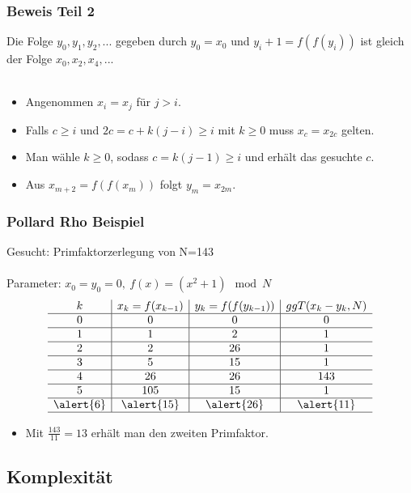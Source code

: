 \documentclass[mathserif, compress]{beamer}
\begin{document}
\begin{frame}
  \frametitle{Beweis Teil 2}
Die Folge $y_0, y_1, y_2, ...$ gegeben durch $y_0 = x_0$ und
$y_i+1 = f(f(y_i))$ ist gleich der Folge $x_0, x_2, x_4,...$ \\
\ \\
  \begin{itemize}
    \item<2-> Angenommen $x_i=x_j$ f\"ur $j>i$.
     \vspace{3mm}
    \item<3-> Falls $c\geq i$ und $2c=c+k(j-i)\geq i$ mit $k\geq 0$ muss $x_c=x_{2c}$ gelten.
     \vspace{3mm}
    \item<4-> Man w\"ahle $k\geq 0$, sodass $c=k(j-1)\geq i$ und erh\"alt das gesuchte $c$.
     \vspace{3mm}
    \item<5-> Aus $x_{m+2}=f(f(x_m))$ folgt $y_m = x_{2m}$.
  \end{itemize}
\end{frame}

\begin{frame}
  \frametitle{Pollard Rho Beispiel}
Gesucht: Primfaktorzerlegung von N=143\\
\ \\
Parameter: $x_0 = y_0 = 0, \ f(x)=(x^2+1)\mod N$
	$$
  \begin{array}{c|c|c|c}
	k & x_k = f(x_{k-1}) & y_k = f(f(y_{k-1})) & ggT(x_k - y_k, N) \\ \hline 
        0 & 0 & 0 & 0 \\ \hline
	1 & 1 & 2 & 1 \\ \hline
	2 & 2 & 26 & 1 \\ \hline
	3 & 5 & 15 & 1 \\ \hline
	4 & 26 & 26 & 143 \\ \hline
	5 & 105 & 15 & 1 \\ \hline
	\alert{6} & \alert{15} & \alert{26} & \alert{11} \\ \hline
  \end{array}
	$$
\begin{itemize}
  \item<2-> Mit $\frac{143}{11}=13$ erh\"alt man den zweiten Primfaktor. 
\end{itemize}
\end{frame}

\subsection{Komplexit\"at}
\end{document}
